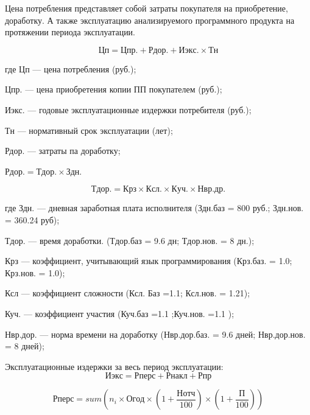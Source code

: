 Цена потребления представляет собой затраты покупателя на приобретение, доработку.
А также эксплуатацию анализируемого программного продукта на протяжении периода эксплуатации.

\begin{equation}
	Цп = Цпр. + Рдор. + Иэкс. \times{} Тн
\end{equation}

\begin{ESKDexplanation}
	\item[где ]{} Цп --- цена потребления (руб.);
	\item{} Цпр. --- цена приобретения копии ПП покупателем (руб.);
	\item{} Иэкс. --- годовые эксплуатационные издержки потребителя (руб.);
	\item{} Тн --- нормативный срок эксплуатации (лет);
	\item{} Рдор. --- затраты па доработку;
\end{ESKDexplanation}

$Рдор.=Тдор.\times{}Здн$.

\begin{equation}
Тдор. = Крз \times{} Ксл. \times{} Куч. \times{} Нвр.др.
\end{equation}

\begin{ESKDexplanation}
	\item[где ]{} Здн. --- дневная заработная плата исполнителя (Здн.баз = 800 руб.; Здн.нов. = 360.24 руб);
	\item{} Тдор. --- время доработки. (Тдор.баз = 9.6 дн;   Тдор.нов. = 8 дн.);
	\item{} Крз --- коэффициент, учитывающий язык программирования (Крз.баз. = 1.0;  Крз.нов. = 1.0);
	\item{} Ксл --- коэффициент сложности (Ксл. Баз =1.1;  Ксл.нов. = 1.21);
	\item{} Куч. --- коэффициент участия (Куч.баз =1.1 ;Куч.нов. =1.1 );
	\item{} Нвр.дор. --- норма времени на доработку (Нвр.дор.баз. = 9.6 дней; Нвр.дор.нов. = 8 дней);
\end{ESKDexplanation}

Эксплуатационные издержки за весь период эксплуатации:
\begin{equation}
	Иэкс =  Рперс +  Рнакл +  Рпр
\end{equation}

\begin{equation}
	Рперс = sum{} (n_i \times{} Огод \times{} (1 + \frac{Нотч}{100}) \times{} (1 + \frac{П}{100}))
\end{equation}

